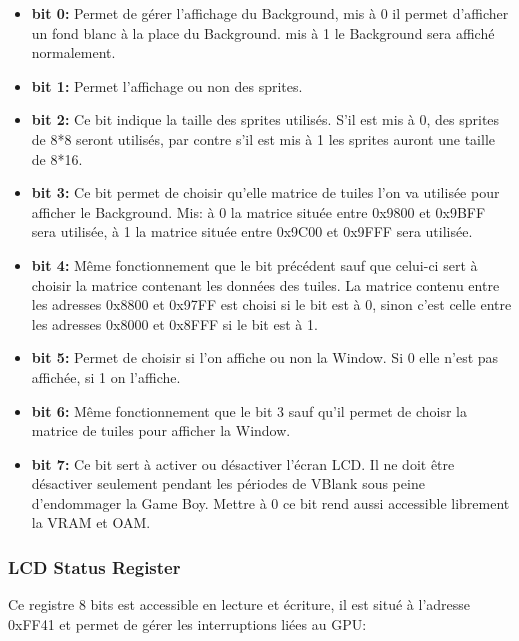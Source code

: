 \documentclass{report}
\begin{document}
\begin{itemize}
\item \textbf{bit 0:}
	Permet de gérer l'affichage du Background, mis à 0 il permet d'afficher un fond blanc à la place du Background. mis à 1 le Background sera affiché normalement.\\
\item \textbf{bit 1:}
	Permet l'affichage ou non des sprites.\\
\item \textbf{bit 2:}
	Ce bit indique la taille des sprites utilisés. S'il est mis à 0, des sprites de 8*8 seront utilisés, par contre s'il est mis à 1 les sprites auront une taille de 8*16.\\
\item \textbf{bit 3:}
	Ce bit permet de choisir qu'elle matrice de tuiles l'on va utilisée pour afficher le Background. Mis: à 0 la matrice située entre 0x9800 et 0x9BFF sera utilisée, à 1 la matrice située entre 0x9C00 et 0x9FFF sera utilisée.\\
\item \textbf{bit 4:}
	Même fonctionnement que le bit précédent sauf que celui-ci sert à choisir la matrice contenant les données des tuiles. La matrice contenu entre les adresses 0x8800 et 0x97FF est choisi si le bit est à 0, sinon c'est celle entre les adresses 0x8000 et 0x8FFF si le bit est à 1.\\
\item \textbf{bit 5:}
	Permet de choisir si l'on affiche ou non la Window. Si 0 elle n'est pas affichée, si 1 on l'affiche.\\
\item \textbf{bit 6:}
	Même fonctionnement que le bit 3 sauf qu'il permet de choisr la matrice de tuiles pour afficher la Window.\\
\item \textbf{bit 7:}
	Ce bit sert à activer ou désactiver l'écran LCD. Il ne doit être désactiver seulement pendant les périodes de VBlank sous peine d'endommager la Game Boy. Mettre à 0 ce bit rend aussi accessible librement la VRAM et OAM.\\
\end{itemize}

\subsubsection{LCD Status Register}
Ce registre 8 bits est accessible en lecture et écriture, il est situé à l'adresse 0xFF41 et permet de gérer les interruptions liées au GPU:\\
\end{document}
